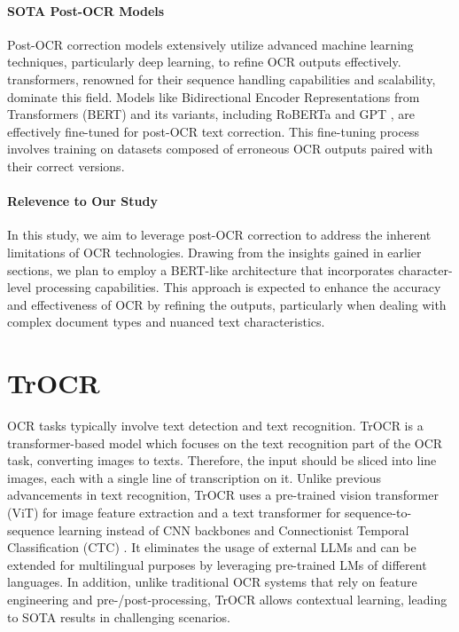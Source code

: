 \paragraph*{SOTA Post-OCR Models}
Post-OCR correction models extensively utilize advanced machine learning techniques, particularly deep learning, to refine OCR outputs effectively. transformers, renowned for their sequence handling capabilities and scalability, dominate this field. Models like Bidirectional Encoder Representations from Transformers (BERT) \citep{devlin-etal-2019-bert} and its variants, including RoBERTa \citep{liu2019roberta} and GPT \citep{radford2018improving}, are effectively fine-tuned for post-OCR text correction. This fine-tuning process involves training on datasets composed of erroneous OCR outputs paired with their correct versions. 

\paragraph*{Relevence to Our Study}
\label{par:2_post_ocr_relevance}
\hypertarget{model_needs}{In this study, we aim to leverage post-OCR correction to address the inherent limitations of OCR technologies. Drawing from the insights gained in earlier sections, we plan to employ a BERT-like architecture that incorporates character-level processing capabilities. This approach is expected to enhance the accuracy and effectiveness of OCR by refining the outputs, particularly when dealing with complex document types and nuanced text characteristics.}

\section{TrOCR}
\label{sec:2_trocr}
OCR tasks typically involve text detection and text recognition. TrOCR is a transformer-based model which focuses on the text recognition part of the OCR task, converting images to texts. Therefore, the input should be sliced into line images, each with a single line of transcription on it. Unlike previous advancements in text recognition, TrOCR uses a pre-trained vision transformer (ViT) \citep{dosovitskiy2021an} for image feature extraction and a text transformer \citep{vaswani2017attention} for sequence-to-sequence learning instead of CNN backbones \citep{wang2020cspnet} and Connectionist Temporal Classification (CTC) \citep{graves2006connectionist}. It eliminates the usage of external LLMs and can be extended for multilingual purposes by leveraging pre-trained LMs of different languages. In addition, unlike traditional OCR systems that rely on feature engineering and pre-/post-processing, TrOCR allows contextual learning, leading to SOTA results in challenging scenarios.

